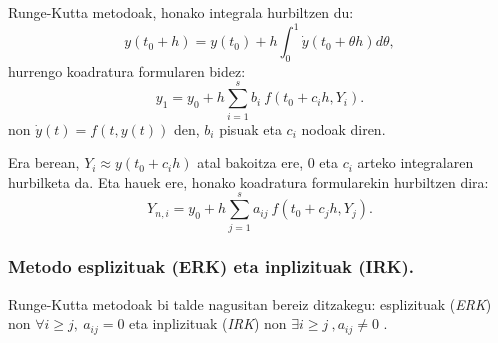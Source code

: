 Runge-Kutta metodoak, honako integrala hurbiltzen du:
\begin{equation*}
y(t_0+h)=y(t_0)+h \int_{0}^{1} \dot{y}(t_0+\theta h) d\theta,
\end{equation*} 
 hurrengo koadratura formularen bidez:
\begin{equation*}
 y_{1}=y_0+h\sum^s_{i=1}{b_i \ f(t_0+c_ih,Y_{i})}.
\end{equation*}
non $\dot{y}(t)=f(t,y(t))$ den, $b_i$ pisuak eta $c_i$ nodoak diren.

Era berean, $Y_{i} \approx y(t_0+c_ih)$ atal bakoitza ere, $0$ eta $c_i$ arteko integralaren hurbilketa da. Eta hauek ere, honako koadratura formularekin hurbiltzen dira:
\begin{equation*}
Y_{n,i}=y_0+h \sum_{j=1}^{s} a_{ij} \ f(t_0+c_jh,Y_{j}).
\end{equation*}

\subsubsection*{Metodo esplizituak (ERK) eta inplizituak (IRK).}
Runge-Kutta metodoak bi talde nagusitan bereiz ditzakegu: esplizituak (\emph {ERK}) non $\forall i\ge j, \ a_{ij}=0 $ eta inplizituak (\emph {IRK}) non $\exists i \ge j \ , a_{ij} \ne 0$ . 


